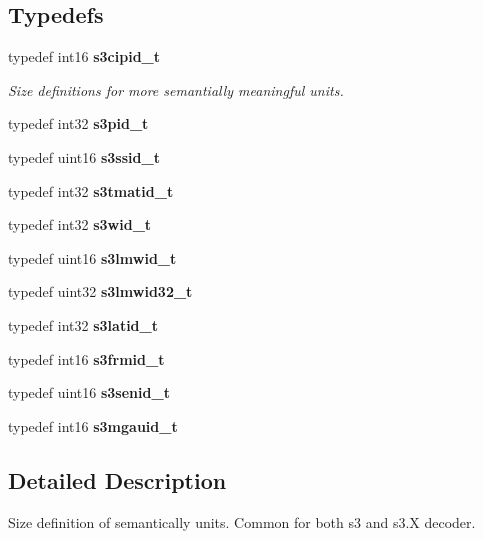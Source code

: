 \subsection*{Typedefs}
\begin{DoxyCompactItemize}
\item 
typedef int16 {\bf s3cipid\-\_\-t}
\begin{DoxyCompactList}\small\item\em Size definitions for more semantially meaningful units. \end{DoxyCompactList}\item 
typedef int32 {\bfseries s3pid\-\_\-t}\label{s3types_8h_ace0794ef7ba6d215e2688832216771b8}

\item 
typedef uint16 {\bfseries s3ssid\-\_\-t}\label{s3types_8h_afa911acbebf09269bbc7b6821aee9c1d}

\item 
typedef int32 {\bfseries s3tmatid\-\_\-t}\label{s3types_8h_a6a7df1b2c1909fbe51979dac693549c0}

\item 
typedef int32 {\bfseries s3wid\-\_\-t}\label{s3types_8h_a1d7fc272539abdf946c1074f9ec9a71c}

\item 
typedef uint16 {\bfseries s3lmwid\-\_\-t}\label{s3types_8h_a89e3ea581c1da1df174ab36e26fc4786}

\item 
typedef uint32 {\bfseries s3lmwid32\-\_\-t}\label{s3types_8h_a7f1f08f03cf077a12500eabc6f6c509c}

\item 
typedef int32 {\bfseries s3latid\-\_\-t}\label{s3types_8h_ad0b520b3256061b8113b5bd347af8351}

\item 
typedef int16 {\bfseries s3frmid\-\_\-t}\label{s3types_8h_a29b7bbfa3ed1d10a94ecf682e05458ae}

\item 
typedef uint16 {\bfseries s3senid\-\_\-t}\label{s3types_8h_a81dd5c138da323d5305623c1ce123593}

\item 
typedef int16 {\bfseries s3mgauid\-\_\-t}\label{s3types_8h_a8bfa16957530ae6c95f3354a3f24ab5d}

\end{DoxyCompactItemize}


\subsection{Detailed Description}
Size definition of semantically units. Common for both s3 and s3.\-X decoder. 

